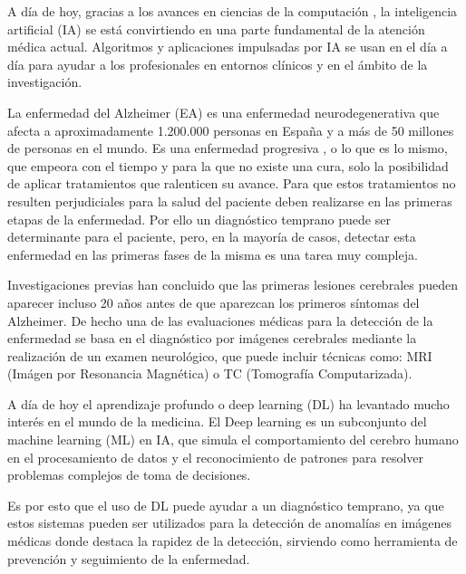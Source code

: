

    A día de hoy, gracias a los avances en ciencias de la computación , la inteligencia artificial (IA) se está convirtiendo
    en una parte fundamental de la atención médica actual. Algoritmos y aplicaciones impulsadas por IA se usan en el día a
    día para ayudar a los profesionales en
    entornos clínicos  y en el ámbito de la investigación.

    La enfermedad del Alzheimer (EA)  es una enfermedad  neurodegenerativa que afecta a aproximadamente 1.200.000 personas
    en España y a más de 50 millones de personas en el mundo.  Es una enfermedad progresiva , o lo que es lo mismo, que
    empeora con el tiempo y para la que no existe una cura, solo la posibilidad de aplicar tratamientos que ralenticen su
    avance. Para que estos tratamientos no resulten perjudiciales para la salud del paciente deben realizarse en las
    primeras etapas de la enfermedad.  Por ello un diagnóstico temprano puede ser determinante para el paciente, pero,
    en la mayoría de casos, detectar esta enfermedad en las primeras fases de la misma es una tarea muy compleja.

    Investigaciones previas han concluido que las primeras lesiones cerebrales pueden aparecer incluso 20 años antes de que
    aparezcan los primeros síntomas del Alzheimer. De hecho una de las evaluaciones médicas para la detección de la
    enfermedad se basa en el diagnóstico por imágenes cerebrales mediante la realización de un examen neurológico, que puede
    incluir técnicas como: MRI (Imágen por Resonancia Magnética) o TC (Tomografía Computarizada).

    A día de hoy el aprendizaje profundo o deep learning (DL)  ha levantado mucho interés en el mundo de la medicina. El
    Deep learning es un subconjunto del machine learning (ML) en IA, que simula el comportamiento del cerebro humano en el
    procesamiento de datos y el reconocimiento de patrones para resolver problemas complejos de toma de decisiones.

    Es por esto que el uso de DL puede ayudar a  un diagnóstico temprano, ya que estos sistemas pueden ser utilizados para
    la detección de anomalías en imágenes médicas donde destaca la rapidez de la detección,  sirviendo como herramienta de
    prevención y seguimiento de la enfermedad.


